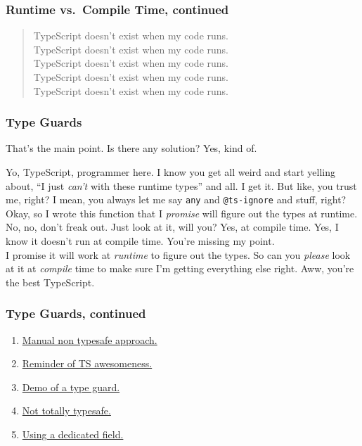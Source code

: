 \documentclass[aspectratio=169]{beamer}
\begin{document}
\begin{frame}
  \frametitle{Runtime vs.\ Compile Time, continued}
  \begin{quote}
    TypeScript doesn't exist when my code runs. \\
    TypeScript doesn't exist when my code runs. \\
    TypeScript doesn't exist when my code runs. \\
    TypeScript doesn't exist when my code runs. \\
    TypeScript doesn't exist when my code runs.
  \end{quote}
\end{frame}

\begin{frame}[fragile]
  \frametitle{Type Guards}
  \small

  That's the main point. Is there any solution? Yes, kind of. \\

  \begin{tcolorbox}
    Yo, TypeScript, programmer here. I know you get all weird and start
    yelling about, ``I just \emph{can't} with these runtime types'' and all.
    I get it. But like, you trust me, right? I mean, you always let me say
    \texttt{any} and \texttt{@ts-ignore} and stuff, right? \\

    Okay, so I wrote this function that I \emph{promise} will figure out the
    types at runtime. No, no, don't freak out. Just look at it, will you?
    Yes, at compile time. Yes, I know it doesn't run at compile time. You're
    missing my point. \\

    I promise it will work at \emph{runtime} to figure out the types. So can
    you \textit{please} look at it at \emph{compile} time to make sure I'm
    getting everything else right. Aww, you're the best TypeScript.
  \end{tcolorbox}
\end{frame}

\begin{frame}[fragile]
  \frametitle{Type Guards, continued}

  \begin{enumerate}
    \item \href{https://bit.ly/3taav6c}{Manual non typesafe approach.}
    \item \href{https://bit.ly/3uNRsPJ}{Reminder of TS awesomeness.}
    \item \href{https://bit.ly/2OEFnNa}{Demo of a type guard.}
    \item \href{https://bit.ly/2RsdNnw}{Not totally typesafe.}
    \item \href{https://bit.ly/2RvwPt9}{Using a dedicated field.}
  \end{enumerate}
\end{frame}
\end{document}
